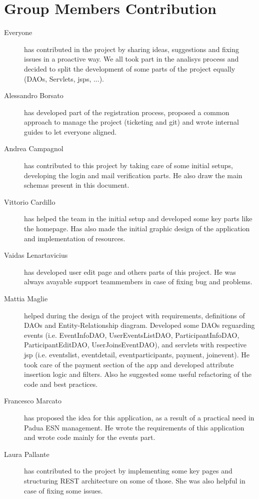 \section{Group Members Contribution}

\begin{description}
    \item[Everyone] has contributed in the project by sharing ideas, suggestions and fixing issues in a proactive way. We all took part in the analisys process and decided to split the development of some parts of the project equally (DAOs, Servlets, jsps, ...).
    \item[Alessandro Borsato] has developed part of the registration process, proposed a common approach to manage the project (ticketing and git) and wrote internal guides to let everyone aligned.
    \item[Andrea Campagnol] has contributed to this project by taking care of some initial setups, developing the login and mail verification parts. He also draw the main schemas present in this document.
    \item[Vittorio Cardillo] has helped the team in the initial setup and developed some key parts like the homepage. Has also made the initial graphic design of the application and implementation of resources.
    \item[Vaidas Lenartavicius] has developed user edit page and others parts of this project. He was always avayable support teammembers in case of fixing bug and problems.
    \item[Mattia Maglie] helped during the design of the project with requirements, definitions of DAOs and Entity-Relationship diagram. Developed some DAOs reguarding events (i.e. EventInfoDAO, UserEventsListDAO, ParticipantInfoDAO, ParticipantEditDAO, UserJoinsEventDAO), and servlets with respective jsp (i.e. eventslist, eventdetail, eventparticipants, payment, joinevent). He took care of the payment section of the app and developed attribute insertion logic and filters. Also he suggested some useful refactoring of the code and best practices.
    \item[Francesco Marcato] has proposed the idea for this application, as a result of a practical need in Padua ESN management. He wrote the requirements of this application and wrote code mainly for the events part.
    \item[Laura Pallante] has contributed to the project by implementing some key pages and structuring REST architecture on some of those. She was also helpful in case of fixing some issues.

\end{description}
